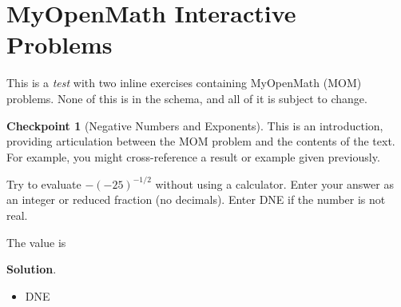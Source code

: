 \documentclass{amsart}
\theoremstyle{plain}%
\theoremstyle{definition}%
\newtheorem{inlineexercise}[theorem]{Checkpoint}
\theoremstyle{remark}%
\newcommand{\blocktitlefont}{\relax}
\numberwithin{equation}{section}
\begin{document}
\section{MyOpenMath Interactive Problems}\label{section-myopenmath}%
This is a \emph{test} with two inline exercises containing MyOpenMath (MOM) problems.  None of this is in the schema, and all of it is subject to change.%
\begin{inlineexercise}[Negative Numbers and Exponents]\label{section-myopenmath-3}%
%
This is an introduction, providing articulation between the MOM problem and the contents of the text.  For example, you might cross-reference a result or example given previously.%
\par
Try to evaluate \(\displaystyle-{\left(-{25}\right)}^{{-{1}{/}{2}}}\) without using a calculator. Enter your answer as an integer or reduced fraction (no decimals). Enter DNE if the number is not real.%
\par
The value is   %
\par\smallskip%
\noindent\textbf{\blocktitlefont Solution}.\hypertarget{section-myopenmath-3-3}{}\quad{}%
\begin{itemize}[label=\textbullet]
\item{}DNE%
\end{itemize}
%
\end{inlineexercise}%
\end{document}
